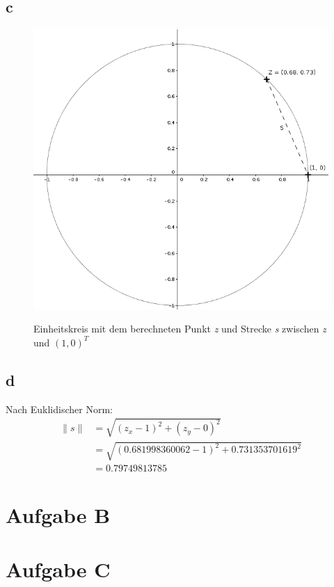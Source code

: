 \documentclass{../Vorlage/mat}
\begin{document}
\subsection*{c}
\begin{figure}[!htb]
\centering
	\includegraphics[scale=0.5]{circle_s.png}
	\label{circles}
	\caption{Einheitskreis mit dem berechneten Punkt \textit{z} und Strecke \textit{s} zwischen \textit{z} und $(1,0)^T$}
\end{figure}

\subsection*{d}
Nach Euklidischer Norm:
\begin{align*}
\|s\| & = \sqrt{(z_x - 1)^2 + (z_y - 0)^2}\\
& = \sqrt{(0.681998360062 - 1)^2 + 0.731353701619^2}\\
& = 0.79749813785
\end{align*}

\section*{Aufgabe B}


\section*{Aufgabe C}
\end{document}
